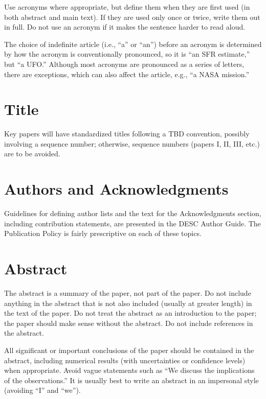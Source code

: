 \documentclass[letterpaper,11pt]{article}
\begin{document}
Use acronyms where appropriate, but define them when they are first used
(in both
abstract and main text).  If they are used only once or twice, write them out
in full.  Do not use an acronym if it makes the sentence harder to read aloud.

The choice of indefinite article (i.e., ``a'' or ``an'') before an
acronym is determined by how the acronym is conventionally pronounced,
so it is ``an SFR estimate,'' but ``a UFO.''  Although most acronyms are
pronounced as a series of letters, there are exceptions, which can also affect
the article, e.g., ``a NASA mission.''

\section{Title}

Key papers will have standardized titles following a TBD convention, possibly involving a sequence number; otherwise, sequence numbers (papers I, II, III, etc.) are to be avoided.

\section{Authors and Acknowledgments}

Guidelines for defining author lists and the text for the Acknowledgments section, including contribution statements, are presented in the DESC Author Guide.  The Publication Policy is fairly prescriptive on each of these topics.  

\section{Abstract}

The abstract is a summary of the paper, not part of the paper.  Do not include
anything in the abstract that is not also included (usually at greater length)
in the text of the paper. Do not treat the abstract as an introduction to the
paper; the paper should make sense without the abstract.  Do not include
references in the abstract.

All significant or important conclusions of the paper should be contained
in the abstract, including numerical results (with uncertainties or confidence
levels) when appropriate.  Avoid vague statements such as ``We discuss the
implications of the observations.''  It is usually best to write an abstract
in an impersonal style (avoiding ``I'' and ``we'').
\end{document}
